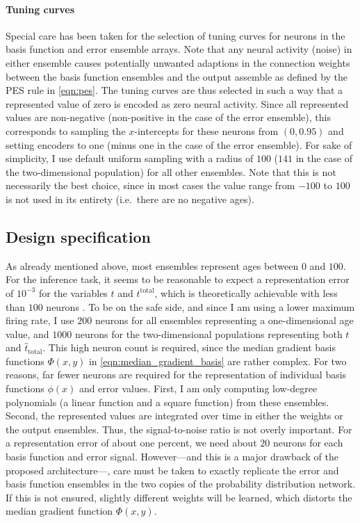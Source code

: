 \documentclass[a4paper,11pt]{article}
\begin{document}
\paragraph{Tuning curves}
Special care has been taken for the selection of tuning curves for neurons in the basis function and error ensemble arrays. Note that any neural activity (noise) in either ensemble causes potentially unwanted adaptions in the connection weights between the basis function ensembles and the output assemble as defined by the PES rule in \cref{eqn:pes}. The tuning curves are thus selected in such a way that a represented value of zero is encoded as zero neural activity. Since all represented values are non-negative (non-positive in the case of the error ensemble), this corresponds to sampling the $x$-intercepts for these neurons from $(0, 0.95)$ and setting encoders to one (minus one in the case of the error ensemble). For sake of simplicity, I use default uniform sampling with a radius of $100$ ($141$ in the case of the two-dimensional population) for all other ensembles. Note that this is not necessarily the best choice, since in most cases the value range from $-100$ to $100$ is not used in its entirety (i.e.~there are no negative ages).

\subsection{Design specification}

As already mentioned above, most ensembles represent ages between $0$ and $100$. For the inference task, it seems to be reasonable to expect a representation error of $10^{-3}$ for the variables $t$ and $t^\mathrm{total}$, which is theoretically achievable with less than $100$ neurons \cite{eliasmith2003neural}. To be on the safe side, and since I am using a lower maximum firing rate, I use $200$ neurons for all ensembles representing a one-dimensional age value, and $1000$ neurons for the two-dimensional populations representing both $t$ and $\hat t_\mathrm{total}$. This high neuron count is required, since the median gradient basis functions $\Phi(x, y)$ in \cref{eqn:median_gradient_basis} are rather complex. For two reasons, far fewer neurons are required for the representation of individual basis functions $\phi(x)$ and error values. First, I am only computing low-degree polynomials (a linear function and a square function) from these ensembles. Second, the represented values are integrated over time in either the weights or the output ensembles. Thus, the signal-to-noise ratio is not overly important. For a representation error of about one percent, we need about $20$ neurons for each basis function and error signal. However---and this is a major drawback of the proposed architecture---, care must be taken to exactly replicate the error and basis function ensembles in the two copies of the probability distribution network. If this is not ensured, slightly different weights will be learned, which distorts the median gradient function $\Phi(x, y)$.
\end{document}

